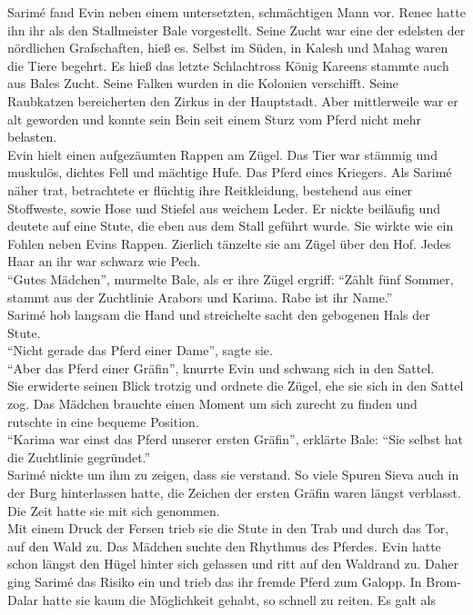 Sarimé fand Evin neben einem untersetzten, schmächtigen Mann vor. Renec hatte ihn ihr als den 
Stallmeister Bale vorgestellt. Seine Zucht war eine der edelsten der nördlichen Grafschaften, hieß 
es. Selbst im Süden, in Kalesh und Mahag waren die Tiere begehrt. Es hieß das letzte Schlachtross 
König Kareens stammte auch aus Bales Zucht. Seine Falken wurden in die Kolonien verschifft. Seine 
Raubkatzen bereicherten den Zirkus in der Hauptstadt. Aber mittlerweile war er alt geworden und 
konnte sein Bein seit einem Sturz vom Pferd nicht mehr belasten.\\
Evin hielt einen aufgezäumten Rappen am Zügel. Das Tier war stämmig und muskulös, dichtes Fell und 
mächtige Hufe. Das Pferd eines Kriegers. Als Sarimé näher trat, betrachtete er flüchtig ihre 
Reitkleidung, bestehend aus einer Stoffweste, sowie Hose und Stiefel aus weichem Leder. Er nickte 
beiläufig und deutete auf eine Stute, die eben aus dem Stall geführt wurde. Sie wirkte wie ein 
Fohlen neben Evins Rappen. Zierlich tänzelte sie am Zügel über den Hof. Jedes Haar an ihr war 
schwarz wie Pech.\\
``Gutes Mädchen'', murmelte Bale, als er ihre Zügel ergriff: ``Zählt fünf Sommer, stammt aus der 
Zuchtlinie Arabors und Karima. Rabe ist ihr Name.''\\
Sarimé hob langsam die Hand und streichelte sacht den gebogenen Hals der Stute.\\
``Nicht gerade das Pferd einer Dame'', sagte sie.\\
``Aber das Pferd einer Gräfin'', knurrte Evin und schwang sich in den Sattel.\\
Sie erwiderte seinen Blick trotzig und ordnete die Zügel, ehe sie sich in den Sattel zog. Das 
Mädchen brauchte einen Moment um sich zurecht zu finden und rutschte in eine bequeme Position.\\
``Karima war einst das Pferd unserer ersten Gräfin'', erklärte Bale: ``Sie selbst hat die 
Zuchtlinie gegründet.''\\
Sarimé nickte um ihm zu zeigen, dass sie verstand. So viele Spuren Sieva auch in der Burg 
hinterlassen hatte, die Zeichen der ersten Gräfin waren längst verblasst. Die Zeit hatte sie mit 
sich genommen.\\
Mit einem Druck der Fersen trieb sie die Stute in den Trab und durch das Tor, auf den Wald zu. Das 
Mädchen suchte den Rhythmus des Pferdes. Evin hatte schon längst den Hügel hinter sich gelassen und 
ritt auf den Waldrand zu. Daher ging Sarimé das Risiko ein und trieb das ihr fremde Pferd zum 
Galopp. In Brom-Dalar hatte sie kaum die Möglichkeit gehabt, so schnell zu reiten. Es galt als 
